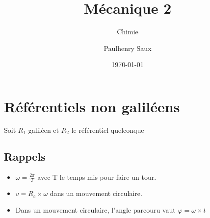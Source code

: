 \documentclass[french]{yLectureNote}
\title{Mécanique 2}
\subtitle{Chimie}
\author{Paulhenry Saux}
\date{\today}
\begin{document}
\setcounter{chapter}{5}

\chapter{Référentiels non galiléens}
Soit \(R_1\) galiléen et \(R_2\) le référentiel quelconque
\section{Rappels}
\begin{itemize}
 \item \(\omega = \frac{2\pi}{T}\) avec T le temps mis pour faire un tour.
 \item \(v = R_c\times \omega\) dans un mouvement circulaire.
 \item Dans un mouvement circulaire, l'angle parcouru vaut \(\varphi = \omega \times t\)
\end{itemize}
\end{document}
